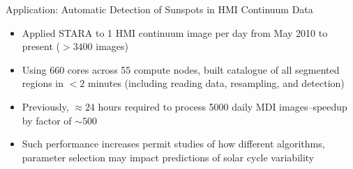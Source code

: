 \begin{block}{Application: Automatic Detection of Sunspots in HMI Continuum Data}
\begin{itemize}
    \item Applied STARA to 1 HMI continuum image per day from May 2010 to present ($>3400$ images)
    \item \alert{Using 660 cores across 55 compute nodes, built catalogue of all segmented regions in $<2$ minutes} (including reading data, resampling, and detection)
    \item Previously, $\approx24$ hours required to process 5000 daily MDI images--\alert{speedup by factor of $\sim500$}
    \item Such performance increases permit studies of how different algorithms, parameter selection may impact predictions of solar cycle variability
\end{itemize}
\end{block}